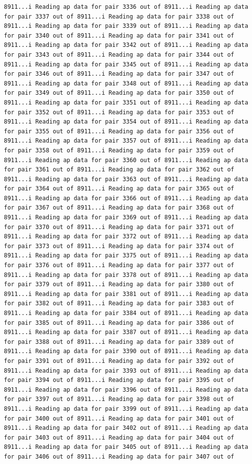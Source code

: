 \documentclass[
]{article}
\begin{document}
\begin{verbatim}
8911...i Reading ap data for pair 3336 out of 8911...i Reading ap data for pair 3337 out of 8911...i Reading ap data for pair 3338 out of 8911...i Reading ap data for pair 3339 out of 8911...i Reading ap data for pair 3340 out of 8911...i Reading ap data for pair 3341 out of 8911...i Reading ap data for pair 3342 out of 8911...i Reading ap data for pair 3343 out of 8911...i Reading ap data for pair 3344 out of 8911...i Reading ap data for pair 3345 out of 8911...i Reading ap data for pair 3346 out of 8911...i Reading ap data for pair 3347 out of 8911...i Reading ap data for pair 3348 out of 8911...i Reading ap data for pair 3349 out of 8911...i Reading ap data for pair 3350 out of 8911...i Reading ap data for pair 3351 out of 8911...i Reading ap data for pair 3352 out of 8911...i Reading ap data for pair 3353 out of 8911...i Reading ap data for pair 3354 out of 8911...i Reading ap data for pair 3355 out of 8911...i Reading ap data for pair 3356 out of 8911...i Reading ap data for pair 3357 out of 8911...i Reading ap data for pair 3358 out of 8911...i Reading ap data for pair 3359 out of 8911...i Reading ap data for pair 3360 out of 8911...i Reading ap data for pair 3361 out of 8911...i Reading ap data for pair 3362 out of 8911...i Reading ap data for pair 3363 out of 8911...i Reading ap data for pair 3364 out of 8911...i Reading ap data for pair 3365 out of 8911...i Reading ap data for pair 3366 out of 8911...i Reading ap data for pair 3367 out of 8911...i Reading ap data for pair 3368 out of 8911...i Reading ap data for pair 3369 out of 8911...i Reading ap data for pair 3370 out of 8911...i Reading ap data for pair 3371 out of 8911...i Reading ap data for pair 3372 out of 8911...i Reading ap data for pair 3373 out of 8911...i Reading ap data for pair 3374 out of 8911...i Reading ap data for pair 3375 out of 8911...i Reading ap data for pair 3376 out of 8911...i Reading ap data for pair 3377 out of 8911...i Reading ap data for pair 3378 out of 8911...i Reading ap data for pair 3379 out of 8911...i Reading ap data for pair 3380 out of 8911...i Reading ap data for pair 3381 out of 8911...i Reading ap data for pair 3382 out of 8911...i Reading ap data for pair 3383 out of 8911...i Reading ap data for pair 3384 out of 8911...i Reading ap data for pair 3385 out of 8911...i Reading ap data for pair 3386 out of 8911...i Reading ap data for pair 3387 out of 8911...i Reading ap data for pair 3388 out of 8911...i Reading ap data for pair 3389 out of 8911...i Reading ap data for pair 3390 out of 8911...i Reading ap data for pair 3391 out of 8911...i Reading ap data for pair 3392 out of 8911...i Reading ap data for pair 3393 out of 8911...i Reading ap data for pair 3394 out of 8911...i Reading ap data for pair 3395 out of 8911...i Reading ap data for pair 3396 out of 8911...i Reading ap data for pair 3397 out of 8911...i Reading ap data for pair 3398 out of 8911...i Reading ap data for pair 3399 out of 8911...i Reading ap data for pair 3400 out of 8911...i Reading ap data for pair 3401 out of 8911...i Reading ap data for pair 3402 out of 8911...i Reading ap data for pair 3403 out of 8911...i Reading ap data for pair 3404 out of 8911...i Reading ap data for pair 3405 out of 8911...i Reading ap data for pair 3406 out of 8911...i Reading ap data for pair 3407 out of 
\end{verbatim}
\end{document}
